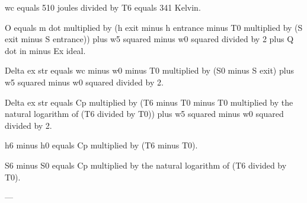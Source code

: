 wc equals 510 joules divided by T6 equals 341 Kelvin.  

O equals m dot multiplied by (h exit minus h entrance minus T0 multiplied by (S exit minus S entrance)) plus w5 squared minus w0 squared divided by 2 plus Q dot in minus Ex ideal.  

Delta ex str equals wc minus w0 minus T0 multiplied by (S0 minus S exit) plus w5 squared minus w0 squared divided by 2.  

Delta ex str equals Cp multiplied by (T6 minus T0 minus T0 multiplied by the natural logarithm of (T6 divided by T0)) plus w5 squared minus w0 squared divided by 2.  

h6 minus h0 equals Cp multiplied by (T6 minus T0).  

S6 minus S0 equals Cp multiplied by the natural logarithm of (T6 divided by T0).  

---